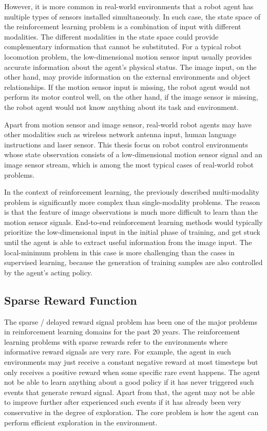 However, it is more common in real-world environments that a robot agent has multiple types of sensors installed simultaneously. In such case, the state space of the reinforcement learning problem is a combination of input with different modalities. The different modalities in the state space could provide complementary information that cannot be substituted. For a typical robot locomotion problem, the low-dimensional motion sensor input usually provides accurate information about the agent's physical status. The image input, on the other hand, may provide information on the external environments and object relationships. If the motion sensor input is missing, the robot agent would not perform its motor control well, on the other hand, if the image sensor is missing, the robot agent would not know anything about its task and environment.


Apart from motion sensor and image sensor, real-world robot agents may have other modalities such as wireless network antenna input, human language instructions and laser sensor. This thesis focus on robot control environments whose state observation consists of a low-dimensional motion sensor signal and an image sensor stream, which is among the most typical cases of real-world robot problems.

In the context of reinforcement learning, the previously described multi-modality problem is significantly more complex than single-modality problems. The reason is that the feature of image observations is much more difficult to learn than the motion sensor signals. End-to-end reinforcement learning methods would typically prioritize the low-dimensional input in the initial phase of training, and get stuck until the agent is able to extract useful information from the image input. The local-minimum problem in this case is more challenging than the cases in supervised learning, because the generation of training samples are also controlled by the agent's acting policy.

\subsection{Sparse Reward Function}
The sparse / delayed reward signal problem has been one of the major problems in reinforcement learning domains for the past 20 years. The reinforcement learning problems with sparse rewards refer to the environments where informative reward signals are very rare. For example, the agent in such environments may just receive a constant negative reward at most timesteps but only receives a positive reward when some specific rare event happens. The agent not be able to learn anything about a good policy if it has never triggered such events that generate reward signal. Apart from that, the agent may not be able to improve further after experienced such events if it has already been very conservative in the degree of exploration. The core problem is how the agent can perform efficient exploration in the environment.

